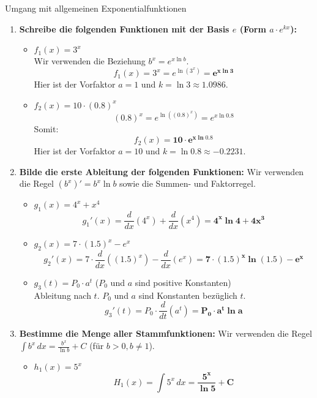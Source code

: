 \begin{loesungsumgebung}{Umgang mit allgemeinen Exponentialfunktionen}

\begin{enumerate}[label=(\alph*)]
    \item \textbf{Schreibe die folgenden Funktionen mit der Basis $e$ (Form $a \cdot e^{kx}$):}
    \begin{itemize}
        \item \textbf{$f_1(x) = 3^x$} \\
        Wir verwenden die Beziehung $b^x = e^{x \ln b}$.
        $$ f_1(x) = 3^x = e^{\ln(3^x)} = \mathbf{e^{x \ln 3}} $$
        Hier ist der Vorfaktor $a=1$ und $k = \ln 3 \approx 1.0986$.

        \item \textbf{$f_2(x) = 10 \cdot (0.8)^x$} \\
        $$ (0.8)^x = e^{\ln((0.8)^x)} = e^{x \ln 0.8} $$
        Somit:
        $$ f_2(x) = \mathbf{10 \cdot e^{x \ln 0.8}} $$
        Hier ist der Vorfaktor $a=10$ und $k = \ln 0.8 \approx -0.2231$.
    \end{itemize}

    \item \textbf{Bilde die erste Ableitung der folgenden Funktionen:}
    Wir verwenden die Regel $(b^x)' = b^x \ln b$ sowie die Summen- und Faktorregel.
    \begin{itemize}
        \item \textbf{$g_1(x) = 4^x + x^4$}
        $$ g_1'(x) = \frac{d}{dx}(4^x) + \frac{d}{dx}(x^4) = \mathbf{4^x \ln 4 + 4x^3} $$

        \item \textbf{$g_2(x) = 7 \cdot (1.5)^x - e^x$}
        $$ g_2'(x) = 7 \cdot \frac{d}{dx}((1.5)^x) - \frac{d}{dx}(e^x) = \mathbf{7 \cdot (1.5)^x \ln(1.5) - e^x} $$

        \item \textbf{$g_3(t) = P_0 \cdot a^t$} ($P_0$ und $a$ sind positive Konstanten) \\
        Ableitung nach $t$. $P_0$ und $a$ sind Konstanten bezüglich $t$.
        $$ g_3'(t) = P_0 \cdot \frac{d}{dt}(a^t) = \mathbf{P_0 \cdot a^t \ln a} $$
    \end{itemize}

    \item \textbf{Bestimme die Menge aller Stammfunktionen:}
    Wir verwenden die Regel $\int b^x \,dx = \frac{b^x}{\ln b} + C$ (für $b>0, b \neq 1$).
    \begin{itemize}
        \item \textbf{$h_1(x) = 5^x$}
        $$ H_1(x) = \int 5^x \,dx = \mathbf{\frac{5^x}{\ln 5} + C} $$


\end{itemize}
\end{enumerate}
\end{loesungsumgebung}

